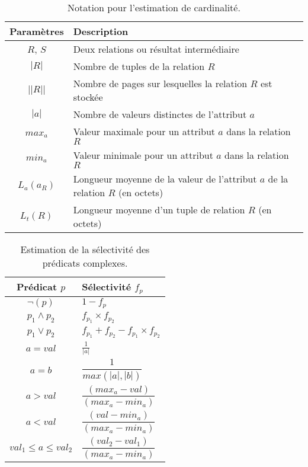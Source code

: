 \begin{table}
\centering
\caption {Notation pour l'estimation de cardinalité.} \label{tab:cardinality-notation}
\begin{tabular}{cl}
    \toprule
    \textbf{Paramètres} & \textbf{Description} \\
    \midrule
    $R$, $S$ & Deux relations ou résultat intermédiaire \\ 
	$|R|$ & Nombre de tuples de la relation $R$ \\ 
	$||R||$ & Nombre de pages sur lesquelles la relation $R$ est stockée \\ 
	$|a|$ & Nombre de valeurs distinctes de l'attribut $a$ \\
    $max_a$ & Valeur maximale pour un attribut $a$ dans la relation $R$ \\
    $min_a$ & Valeur minimale pour un attribut $a$ dans la relation $R$ \\
    $L_a(a_R)$ & Longueur moyenne de la valeur de l'attribut $a$ de la relation $R$ (en octets) \\
    $L_t(R)$ & Longueur moyenne d'un tuple de relation $R$ (en octets) \\
    \bottomrule
\end{tabular}
\end{table}

\begin{table}
\centering
\caption {Estimation de la sélectivité des prédicats complexes.} \label{tab:sel-predicats}
\begin{tabular}{cl}
    \toprule
    \textbf{Prédicat $p$} & \textbf{Sélectivité $f_p$} \\
    \midrule
    $\neg(p)$ & $1-f_p$ \\
    $p_1 \wedge p_2$ & $f_{p_1} \times f_{p_2}$ \\
    $p_1 \vee p_2$ & $f_{p_1} + f_{p_2} - f_{p_1} \times f_{p_2}$ \\
    $a = val $ & $\frac{1}{|a|}$ \\
    $a = b$ & $\dfrac{1}{max(|a|, |b|)}$ \\
    $a > val$ & $\dfrac{(max_a - val)}{(max_a - min_a)}$ \\
    $a < val$ & $\dfrac{(val - min_a)}{(max_a - min_a)}$ \\
    $val_1 \leqslant a \leqslant val_2$ & $\dfrac{(val_2 - val_1)}{(max_a - min_a)}$ \\
    \bottomrule
\end{tabular}
\end{table}

